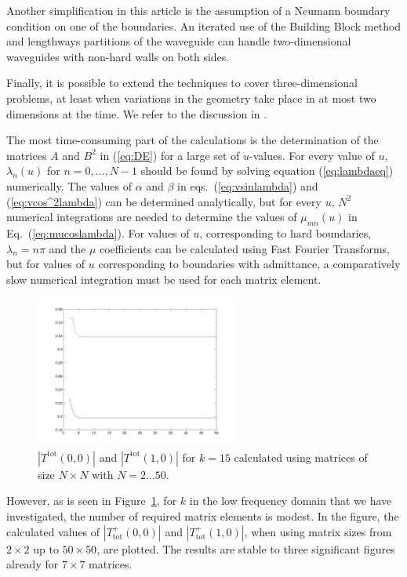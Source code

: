 \documentclass[numreferences]{kluwer}
\providecommand{\abs}[1]{\left\lvert#1\right\rvert}
\newcommand{\Ttot}{T^+_{\text{tot}}}
\begin{document}
Another simplification in this article is the assumption of a Neumann
boundary condition on one of the boundaries. An iterated use of the
Building Block method and lengthways partitions of the waveguide can
handle two-dimensional waveguides with non-hard walls on both sides.

Finally, it is possible to extend the techniques to cover
three-dimensional problems, at least when variations in the geometry
take place in at most two dimensions at the time. We refer to the
discussion in \cite{Nilsson:2002}.


The most time-consuming part of the calculations is the determination
of the matrices $A$ and $B^2$ in (\ref{eq:DE}) for a large set of
$u$-values. For every value of $u$, $\lambda_n(u)$ for $n=0,\dots,N-1$
should be found by solving equation (\ref{eq:lambdaeq}) numerically.
The values of $\alpha$ and $\beta$ in eqs.~(\ref{eq:vsinlambda}) and
(\ref{eq:vcos^2lambda}) can be determined analytically, but for every
$u$, $N^2$ numerical integrations are needed to determine the values
of $\mu_{mn}(u)$ in Eq.~(\ref{eq:mucoslambda}). For values of $u$,
corresponding to hard boundaries, $\lambda_n=n\pi$ and the $\mu$
coefficients can be calculated using Fast Fourier Transforms, but for
values of $u$ corresponding to boundaries with admittance, a
comparatively slow numerical integration must be used for each matrix
element.

\begin{figure}[htb]
  \centering
  \includegraphics[keepaspectratio=false,width=0.7\linewidth,height=5cm]{T_N}
  \caption{$\abs{T^{\text{tot}}(0,0)}$ and $\abs{T^{\text{tot}}(1,0)}$
    for $k=15$ calculated using matrices of size $N\times N$ with
    $N=2\dots50$.}
  \label{fig:T_N}
\end{figure}

However, as is seen in Figure~\ref{fig:T_N}, for $k$ in the low
frequency domain that we have investigated, the number of required
matrix elements is modest.  In the figure, the calculated values of
$\abs{\Ttot(0,0)}$ and $\abs{\Ttot(1,0)}$, when using matrix sizes
from $2\times2$ up to $50\times50$, are plotted. The results are
stable to three significant figures already for $7\times7$ matrices.
\end{document}
